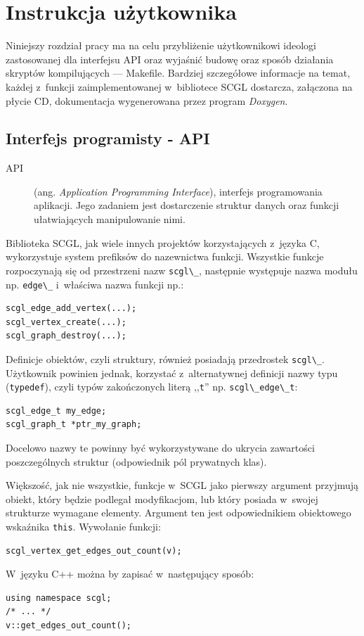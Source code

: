 \documentclass[a4paper,12pt,polish,twoside,openright]{thesis}
\newcommand\code[1]{\lstinline[style=line]{#1}}
\begin{document}
\section{Instrukcja użytkownika}
Niniejszy rozdział pracy ma na celu przybliżenie użytkownikowi ideologi zastosowanej dla interfejsu API oraz wyjaśnić budowę oraz sposób działania skryptów kompilujących --- Makefile.
Bardziej szczegółowe informacje na temat, każdej z~funkcji zaimplementowanej w~bibliotece SCGL dostarcza, załączona na płycie CD, dokumentacja wygenerowana przez program \emph{Doxygen}.

\subsection{Interfejs programisty - API}
\label{chap:api}
\begin{description}
	\item[API] (ang. \emph{Application Programming Interface}), interfejs programowania aplikacji. Jego zadaniem jest dostarczenie struktur danych oraz funkcji ułatwiających manipulowanie nimi\cite{dejagnu}.
\end{description}
Biblioteka SCGL, jak wiele innych projektów korzystających z~języka C, wykorzystuje system prefiksów do nazewnictwa funkcji.
Wszystkie funkcje rozpoczynają się od przestrzeni nazw \code{scgl\_}, następnie występuje nazwa modułu np. \code{edge\_} i~właściwa nazwa funkcji np.:
\begin{lstlisting}[style=coden,caption=Przykłady przestrzeni nazw biblioteki SCGL,label=lst:funsuffix]
scgl_edge_add_vertex(...);
scgl_vertex_create(...);
scgl_graph_destroy(...);
\end{lstlisting}

Definicje obiektów, czyli struktury, również posiadają przedrostek \code{scgl\_}.
Użytkownik powinien jednak, korzystać z~alternatywnej definicji nazwy typu (\code{typedef}), czyli typów zakończonych literą ,,\code{t}'' np. \code{scgl\_edge\_t}:
\begin{lstlisting}[style=coden]
scgl_edge_t my_edge;
scgl_graph_t *ptr_my_graph;
\end{lstlisting}
Docelowo nazwy te powinny być wykorzystywane do ukrycia zawartości poszczególnych struktur (odpowiednik pól prywatnych klas).

Większość, jak nie wszystkie, funkcje w~SCGL jako pierwszy argument przyjmują obiekt, który będzie podlegał modyfikacjom, lub który posiada w~swojej strukturze wymagane elementy.
Argument ten jest odpowiednikiem obiektowego wskaźnika \code{this}.
Wywołanie funkcji:
\begin{lstlisting}[style=coden]
scgl_vertex_get_edges_out_count(v);
\end{lstlisting}
W~języku C++ można by zapisać w~następujący sposób:
\begin{lstlisting}[style=coden]
using namespace scgl;
/* ... */
v::get_edges_out_count();
\end{lstlisting}
\end{document}
